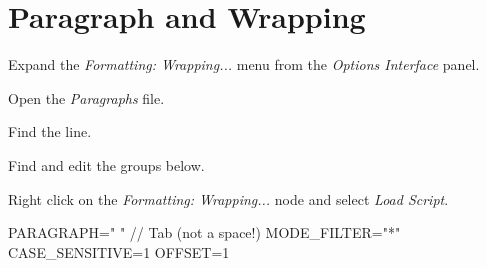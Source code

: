 \documentclass{lebook}
\begin{document}
\section{Paragraph and Wrapping}
\begin{numberedlist}
	\item Expand the \textit{Formatting: Wrapping...} menu from the \textit{Options Interface} panel.
	\item Open the \textit{Paragraphs} file.
	\item Find the \textcode{[PARAGRAPHS]} line.
	\item Find and edit the groups below.
	\item Right click on the \textit{Formatting: Wrapping...} node and select \textit{Load Script}.
\end{numberedlist}
\begin{code}[\codenumbering]{}
	\codeitemnonumber PARAGRAPH="	" // Tab (not a space!)
	\stepcodelevel{}
	\codeitemnonumber MODE\_FILTER="*"
	\codeitemnonumber {}
	\codeitemnonumber CASE\_SENSITIVE=1
	\codeitemnonumber OFFSET=1
	\codeitemnonumber {}
	\prevcodelevel{}
\end{code}
\end{document}
